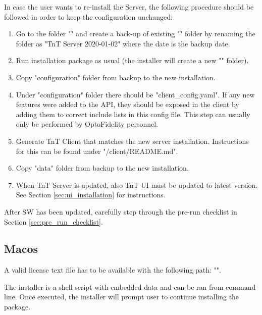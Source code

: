 In case the user wants to re-install the Server, the following procedure should be followed in order to keep the configuration unchanged:
%
\begin{enumerate}
	\item \label{itm:server_first} Go to the folder "\tntRootPath" and create a back-up of existing "\tntServerFolder" folder by renaming the folder as "TnT Server 2020-01-02" where the date is the backup date.
	\item Run installation package as usual (the installer will create a new "\tntServerFolder" folder).
	\item Copy "configuration" folder from backup to the new installation.
	\item Under "configuration" folder there should be "client\_config.yaml". If any new features were added to the API, they should be exposed in the client by adding them to correct include lists in this config file. This step can usually only be performed by OptoFidelity personnel.
	\item Generate TnT Client that matches the new server installation. Instructions for this can be found under "\tntServerFolder/client/README.md".
	\item Copy "data" folder from backup to the new installation.
	\item When TnT Server is updated, also TnT UI must be updated to latest version. See Section \ref{sec:ui_installation} for instructions.
\end{enumerate}

After SW has been updated, carefully step through the pre-run checklist in Section \ref{sec:pre_run_checklist}.

\subsection{Macos}

A valid license text file has to be available with the following path: "\tntLicensePathMacos".

The installer is a shell script with embedded data and can be ran from command-line. Once executed, the installer will prompt user to continue installing the package.

